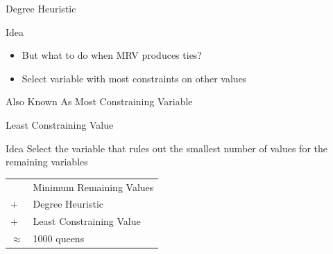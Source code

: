 \documentclass[14pt]{beamer}
\begin{document}
\begin{frame}{Degree Heuristic}
	\begin{block}{Idea}
		\begin{itemize}
			\item But what to do when MRV produces ties?
			\item Select variable with most constraints on other values
		\end{itemize}
	\end{block}
	\pause
	\begin{center}
	\end{center}
	\pause
	\begin{block}{Also Known As}
		Most Constraining Variable
	\end{block}
\end{frame}
\begin{frame}{Least Constraining Value}
	\begin{block}{Idea}
		Select the variable that rules out the smallest
		number of values for the remaining variables
	\end{block}
	\pause
	\begin{center}
	\end{center}
	\pause
	\begin{tabular}{ll}
		          & Minimum Remaining Values \\
		+         & Degree Heuristic \\
		+         & Least Constraining Value \\
		\hline
		$\approx$ & 1000 queens
	\end{tabular}
\end{frame}
\end{document}
